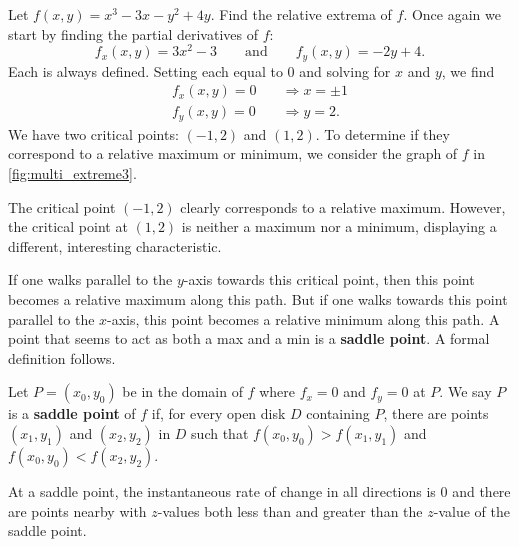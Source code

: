 \begin{example}\label{ex_multi_extreme3}%
Let $f(x,y) = x^3-3x-y^2+4y$. Find the relative extrema of $f$.
\solution
Once again we start by finding the partial derivatives of $f$:
\[f_x(x,y) = 3x^2-3\qquad \text{and} \qquad f_y(x,y) = -2y+4.\]
Each is always defined. Setting each equal to 0 and solving for $x$ and $y$, we find
\begin{align*}
f_x(x,y) = 0 \quad &\Rightarrow x=\pm 1\\
f_y(x,y) = 0\quad &\Rightarrow y = 2.
\end{align*}
We have two critical points: $(-1,2)$ and $(1,2)$. To determine if they correspond to a relative maximum or minimum, we consider the graph of $f$ in \autoref{fig:multi_extreme3}.

The critical point $(-1,2)$ clearly corresponds to a relative maximum. However, the critical point at $(1,2)$ is neither a maximum nor a minimum, displaying a different, interesting characteristic. 

If one walks parallel to the $y$-axis towards this critical point, then this point becomes a relative maximum along this path. But if one walks towards this point parallel to the $x$-axis, this point becomes a relative minimum along this path. A point that seems to act as both a max and a min is a \textbf{saddle point}. A formal definition follows.
\end{example}

\begin{definition}\label{def:saddle_point}%
Let $P=(x_0,y_0)$ be in the domain of $f$ where $f_x=0$ and $f_y=0$ at $P$. We say $P$ is a \textbf{saddle point} of $f$ if, for every open disk $D$ containing $P$, there are points $(x_1,y_1)$ and $(x_2,y_2)$ in $D$ such that $f(x_0,y_0)>f(x_1,y_1)$ and $f(x_0,y_0)<f(x_2,y_2)$.
\end{definition}

At a saddle point, the instantaneous rate of change in all directions is 0 and there are points nearby with $z$-values both less than and greater than the $z$-value of the saddle point.

